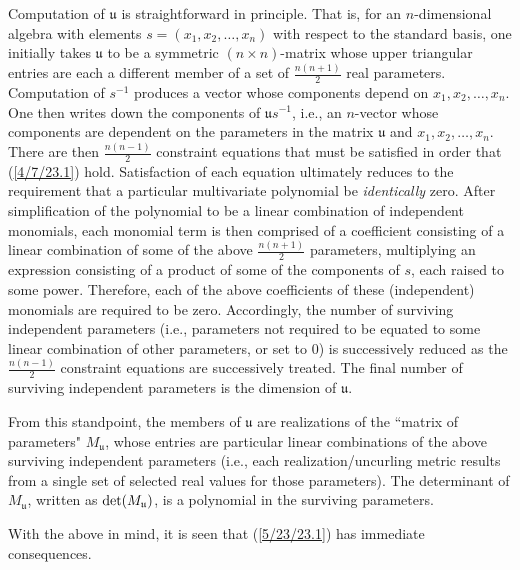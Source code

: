 \documentclass{amsart}
\numberwithin{equation}{section}
\theoremstyle{definition}
\numberwithin{theorem}{section}
\begin{document}
Computation of $\mathfrak{u}$ is straightforward in principle.  That is, for an $n$-dimensional algebra with elements $s = (x_1,x_2,\dots,x_n)$ with respect to the standard basis, one initially takes $\mathfrak{u}$ to be a symmetric $(n\times n)$-matrix  whose upper triangular entries are each a different member of a set of $\frac{n(n+1)}{2}$ real parameters.  Computation of $s^{-1}$ produces a vector whose components depend on $x_1,x_2,\dots,x_n$.  One then writes down the components of $\mathfrak{u}s^{-1}$, i.e., an $n$-vector whose components are dependent on the parameters in the matrix $\mathfrak{u}$ and $x_1,x_2,\dots,x_n$.  There are then $\frac{n(n-1)}{2}$ constraint equations that must be satisfied in order that (\ref{4/7/23.1}) hold.  Satisfaction of each equation ultimately reduces to the requirement that a particular multivariate polynomial be {\it identically} zero.  After simplification of the polynomial to be a linear combination of independent monomials, each monomial term is then comprised of a coefficient consisting of a linear combination of some of the above $\frac{n(n+1)}{2}$ parameters, multiplying an expression consisting of a product of some of the components of $s$, each raised to some power.  Therefore, each of the above coefficients of these (independent) monomials are required to be zero.  Accordingly, the number of surviving independent parameters (i.e., parameters not required to be equated to some linear combination of other parameters, or set to 0) is successively reduced as the $\frac{n(n-1)}{2}$ constraint equations are successively treated.  The final number of surviving independent parameters is the dimension of $\mathfrak{u}$.

From this standpoint, the members of $\mathfrak{u}$ are realizations of the ``matrix of parameters" $M_{\mathfrak{u}}$, whose entries are particular linear combinations of the above surviving independent parameters (i.e., each realization/uncurling metric results from a single set of selected real values for those parameters).  The determinant of $M_{\mathfrak{u}}$, written as ${\rm det}(M_{\mathfrak{u}})$, is a polynomial in the surviving parameters.  

\enlargethispage{1cm}

   With the above in mind, it is seen that (\ref{5/23/23.1}) has immediate consequences.
    
  
    
\end{document}
